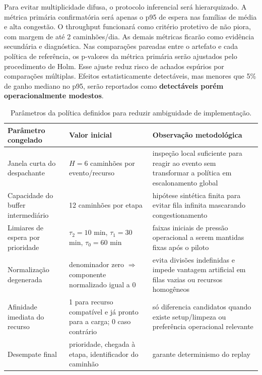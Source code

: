 \documentclass[
  12pt,
  oneside,
  a4paper,
  sumario=tradicional,
  brazil
]{abntex2}
\begin{document}
Para evitar multiplicidade difusa, o protocolo inferencial ser\'a hierarquizado. A m\'etrica prim\'aria confirmat\'oria ser\'a apenas o p95 de espera nas fam\'ilias de m\'edia e alta congest\~ao. O throughput funcionar\'a como crit\'erio protetivo de n\~ao piora, com margem de at\'e 2 caminh\~oes/dia. As demais m\'etricas ficar\~ao como evid\^encia secund\'aria e diagn\'ostica. Nas compara\c{c}\~oes pareadas entre o artefato e cada pol\'itica de refer\^encia, os p-valores da m\'etrica prim\'aria ser\~ao ajustados pelo procedimento de Holm. Esse ajuste reduz risco de achados esp\'urios por compara\c{c}\~oes m\'ultiplas. Efeitos estatisticamente detect\'aveis, mas menores que 5\% de ganho mediano no p95, ser\~ao reportados como \textbf{detect\'aveis por\'em operacionalmente modestos}.

\begin{table}[H]
\centering
\small
\begin{tabular}{|p{}|p{}|p{}|}
\hline
\textbf{Par\^ametro congelado} & \textbf{Valor inicial} & \textbf{Observa\c{c}\~ao metodol\'ogica} \\
\hline
Janela curta do despachante & $H=6$ caminh\~oes por evento/recurso & inspe\c{c}\~ao local suficiente para reagir ao evento sem transformar a pol\'itica em escalonamento global \\
\hline
Capacidade do buffer intermedi\'ario & 12 caminh\~oes por etapa & hip\'otese sint\'etica finita para evitar fila infinita mascarando congestionamento \\
\hline
Limiares de espera por prioridade & $\tau_2=10$ min, $\tau_1=30$ min, $\tau_0=60$ min & faixas iniciais de press\~ao operacional a serem mantidas fixas ap\'os o piloto \\
\hline
Normaliza\c{c}\~ao degenerada & denominador zero $\Rightarrow$ componente normalizado igual a 0 & evita divis\~oes indefinidas e impede vantagem artificial em filas vazias ou recursos homog\^eneos \\
\hline
Afinidade imediata do recurso & 1 para recurso compat\'ivel e j\'a pronto para a carga; 0 caso contr\'ario & s\'o diferencia candidatos quando existe setup/limpeza ou prefer\^encia operacional relevante \\
\hline
Desempate final & prioridade, chegada \`a etapa, identificador do caminh\~ao & garante determinismo do replay \\
\hline
\end{tabular}
\caption{Par\^ametros da pol\'itica definidos para reduzir ambiguidade de implementa\c{c}\~ao.}
\end{table}
\end{document}
